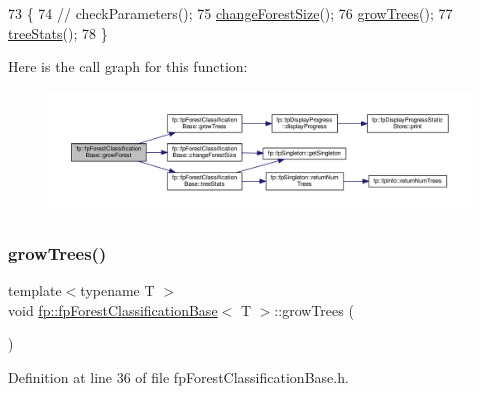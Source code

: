 \begin{DoxyCode}
73                              \{
74                 \textcolor{comment}{//  checkParameters();}
75                 \hyperlink{classfp_1_1fpForestClassificationBase_a696b361df0a1c9aa36687333e2d8111b}{changeForestSize}();
76                 \hyperlink{classfp_1_1fpForestClassificationBase_aea9db2571269f0f627226aa75ec4a694}{growTrees}();
77                 \hyperlink{classfp_1_1fpForestClassificationBase_a48567d379434daeccb1540c84674d286}{treeStats}();
78             \}
\end{DoxyCode}
Here is the call graph for this function\+:
\nopagebreak
\begin{figure}[H]
\begin{center}
\leavevmode
\includegraphics[width=350pt]{classfp_1_1fpForestClassificationBase_a706225fdbef8c71fb022f4c3446b388d_cgraph}
\end{center}
\end{figure}
\mbox{\label{classfp_1_1fpForestClassificationBase_aea9db2571269f0f627226aa75ec4a694}} 
\subsubsection{\texorpdfstring{grow\+Trees()}{growTrees()}}
{\footnotesize\ttfamily template$<$typename T $>$ \\
void \hyperlink{classfp_1_1fpForestClassificationBase}{fp\+::fp\+Forest\+Classification\+Base}$<$ T $>$\+::grow\+Trees (\begin{DoxyParamCaption}{ }\end{DoxyParamCaption})\hspace{0.3cm}{\ttfamily [inline]}}



Definition at line 36 of file fp\+Forest\+Classification\+Base.\+h.


